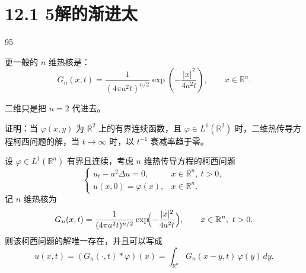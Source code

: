 \section{12.1 5解的渐进太}
95
\begin{dxtips}
更一般的 $n$ 维热核是：
\[
G_n(x,t)
=\frac{1}{(4\pi a^{2}t)^{n/2}}
   \exp\!\left(-\frac{|x|^{2}}{4a^{2}t}\right),\qquad x\in\mathbb{R}^n.
\]

二维只是把 $n=2$ 代进去。    
\end{dxtips}
\begin{homework}[2]
证明：当 $\varphi(x,y)$ 为 $\mathbb R^2$ 上的有界连续函数，且 $\varphi\in L^1(\mathbb R^2)$ 时，二维热传导方程柯西问题的解，当 $t\to\infty$ 时，以 $t^{-1}$ 衰减率趋于零。
\end{homework}
\begin{theorem}[热方程柯西问题的基本解表示]
设 $\varphi\in L^{1}(\mathbb{R}^{n})$ 有界且连续，考虑 $n$ 维热传导方程的柯西问题
\[
\begin{cases}
u_t-a^{2}\Delta u = 0, & x\in\mathbb{R}^{n},\ t>0,\\[0.3em]
u(x,0)=\varphi(x), & x\in\mathbb{R}^{n}.
\end{cases}
\]
记 $n$ 维热核为
\[
G_n(x,t)
=\dfrac{1}{(4\pi a^{2}t)^{n/2}}
  \exp\!\Bigl(-\dfrac{|x|^{2}}{4a^{2}t}\Bigr),\qquad x\in\mathbb{R}^{n},\ t>0.
\]
则该柯西问题的解唯一存在，并且可以写成
\[
u(x,t) = (G_n(\cdot,t)*\varphi)(x)
       = \int_{\mathbb{R}^{n}} G_n(x-y,t)\,\varphi(y)\,dy.
\]
\end{theorem}
